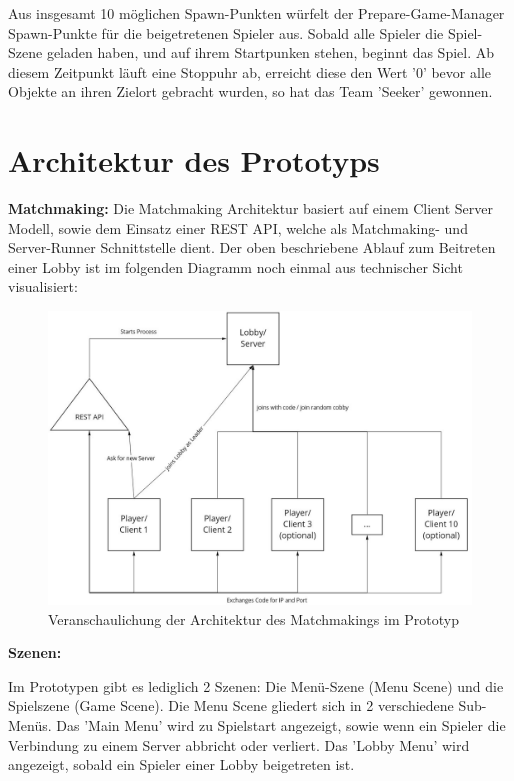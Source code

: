 Aus insgesamt 10 möglichen Spawn-Punkten würfelt der Prepare-Game-Manager Spawn-Punkte für die beigetretenen Spieler aus. Sobald alle Spieler die Spiel-Szene geladen haben, und auf ihrem Startpunken stehen, beginnt das Spiel. Ab diesem Zeitpunkt läuft eine Stoppuhr ab, erreicht diese den Wert '0' bevor alle Objekte an ihren Zielort gebracht wurden, so hat das Team 'Seeker' gewonnen.

\section{Architektur des Prototyps}
\label{Architektur}

\textbf{Matchmaking:}
Die Matchmaking Architektur basiert auf einem Client Server Modell, sowie dem Einsatz einer REST API, welche als Matchmaking- und Server-Runner Schnittstelle dient. Der oben beschriebene Ablauf zum Beitreten einer Lobby ist im folgenden Diagramm noch einmal aus technischer Sicht visualisiert:

\begin{figure}[H]
	\centering
	\includegraphics[width=150mm]{images/prototype_architecture_matchmaking.jpg}
	\caption[Architektur Matchmaking Diagramm]{Veranschaulichung der Architektur des Matchmakings im Prototyp}
	\label{pic:prototype_architecture_matchmaking}
\end{figure}

\textbf{Szenen:}

Im Prototypen gibt es lediglich 2 Szenen: Die Menü-Szene (Menu Scene) und die Spielszene (Game Scene).
Die Menu Scene gliedert sich in 2 verschiedene Sub-Menüs. Das 'Main Menu' wird zu Spielstart angezeigt, sowie wenn ein Spieler die Verbindung zu einem Server abbricht oder verliert. Das 'Lobby Menu' wird angezeigt, sobald ein Spieler einer Lobby beigetreten ist. 

